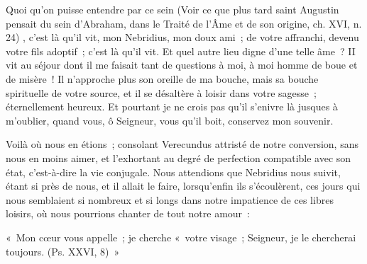 \documentclass[french,twoside]{book} %
\newenvironment{quoteblock}%
  {\begin{quoting}}
  {\end{quoting}}
\newenvironment{quotebar}{%
    \def\FrameCommand{{\color{rubric!10!}\vrule width 0.5em} \hspace{0.9em}}%
    \def\OuterFrameSep{\itemsep} %
    \MakeFramed {\advance\hsize-\width \FrameRestore}
  }%
  {%
    \endMakeFramed
  }
\renewenvironment{quoteblock}%
  {%
    \savenotes
    \setstretch{0.9}
    \normalfont
    \begin{quotebar}
  }
  {%
    \end{quotebar}
    \spewnotes
  }
\begin{document}
 Quoi qu’on puisse entendre par ce sein (Voir ce que plus tard saint Augustin pensait du sein d’Abraham, dans le Traité de l’Âme et de son origine, ch. XVI, n. 24) , c’est là qu’il vit, mon Nebridius, mon doux ami ; de votre affranchi, devenu votre fils adoptif ; c’est là qu’il vit. Et quel autre lieu digne d’une telle âme ? II vit au séjour dont il me faisait tant de questions à moi, à moi homme de boue et de misère ! Il n’approche plus son oreille de ma bouche, mais sa bouche spirituelle de votre source, et il se désaltère à loisir dans votre sagesse ; éternellement heureux. Et pourtant je ne crois pas qu’il s’enivre là jusques à m’oublier, quand vous, ô Seigneur, vous qu’il boit, conservez mon souvenir.\par
Voilà où nous en étions ; consolant Verecundus attristé de notre conversion, sans nous en moins aimer, et l’exhortant au degré de perfection compatible avec son état, c’est-à-dire la vie conjugale. Nous attendions que Nebridius nous suivit, étant si près de nous, et il allait le faire, lorsqu’enfin ils s’écoulèrent, ces jours qui nous semblaient si nombreux et si longs dans notre impatience de ces libres loisirs, où nous pourrions chanter de tout notre amour :\par

\begin{quoteblock}
\noindent « Mon cœur vous appelle ; je cherche « votre visage ; Seigneur, je le chercherai toujours. (Ps. XXVI, 8) »\end{quoteblock}
\end{document}

